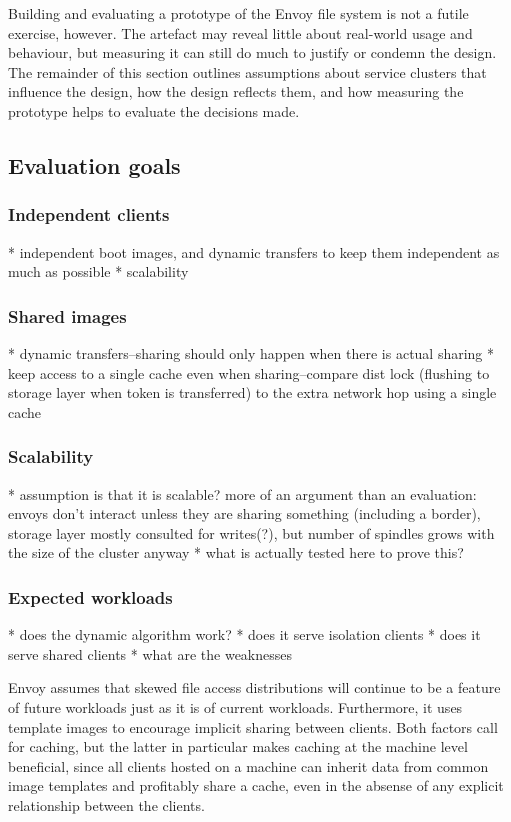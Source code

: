 Building and evaluating a prototype of the Envoy file system is not a futile exercise, however. The artefact may reveal little about real-world usage and behaviour, but measuring it can still do much to justify or condemn the design. The remainder of this section outlines assumptions about service clusters that influence the design, how the design reflects them, and how measuring the prototype helps to evaluate the decisions made.

\subsection{Evaluation goals}

\subsubsection{Independent clients}

* independent boot images, and dynamic transfers to keep them independent as much as possible
* scalability

\subsubsection{Shared images}

* dynamic transfers--sharing should only happen when there is actual sharing
* keep access to a single cache even when sharing--compare dist lock (flushing to storage layer when token is transferred) to the extra network hop using a single cache

\subsubsection{Scalability}

* assumption is that it is scalable?  more of an argument than an evaluation: envoys don't interact unless they are sharing something (including a border), storage layer mostly consulted for writes(?), but number of spindles grows with the size of the cluster anyway
* what is actually tested here to prove this?

\subsubsection{Expected workloads}

* does the dynamic algorithm work?
* does it serve isolation clients
* does it serve shared clients
* what are the weaknesses


Envoy assumes that skewed file access distributions will continue to be a feature of future workloads just as it is of current workloads. Furthermore, it uses template images to encourage implicit sharing between clients. Both factors call for caching, but the latter in particular makes caching at the machine level beneficial, since all clients hosted on a machine can inherit data from common image templates and profitably share a cache, even in the absense of any explicit relationship between the clients.

